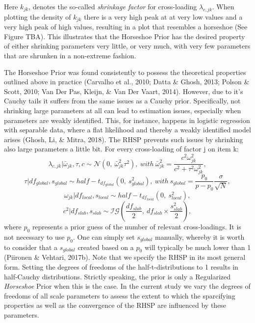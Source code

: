 \documentclass[
  man, donotrepeattitle,floatsintext]{apa6}
\begin{document}
Here \(k_{jk}\), denotes the so-called \emph{shrinkage factor} for cross-loading \(\lambda_{c,jk}\).
When plotting the density of \(k_{jk}\) there is a very high peak at at very low values and a very high peak of high values, resulting in a plot that resembles a horseshoe (See Figure TBA). This illustrates that the Horseshoe Prior has the desired property of either shrinking parameters very little, or very much, with very few parameters that are shrunken in a non-extreme fashion.

The Horseshoe Prior was found consistently to possess the theoretical properties outlined above in practice (Carvalho et al., 2010; Datta \& Ghosh, 2013; Polson \& Scott, 2010; Van Der Pas, Kleijn, \& Van Der Vaart, 2014). However, due to it's Cauchy tails it suffers from the same issues as a Cauchy prior. Specifically, not shrinking large parameters at all can lead to estimation issues, especially when parameters are weakly identified. This, for instance, happens in logistic regression with separable data, where a flat likelihood and thereby a weakly identified model arises (Ghosh, Li, \& Mitra, 2018). The RHSP prevents such issues by shrinking also large parameters a little bit. For every cross-loading of factor j on item k:
\[\lambda_{c,jk} | \bar{\omega}_{jk}, \tau, c\sim \mathcal{N}(0, \ \bar{\omega}^2_{jk} \tau^2), \ with \ \bar{\omega}^2_{jk} = \frac{c^2\omega_{jk}^2}{c^2 + \tau^2 \omega_{jk}^2},\]
\[\tau | df_{global}, s_{global} \sim half-t_{df_{global}}(0,\  s_{global}^2), \ with \  s_{global} = \frac{p_0}{p-p_0}\frac{\sigma}{\sqrt{N}},\]
\[\omega_{jk}| df_{local}, s_{local} \sim half-t_{df_{local}}(0, \ s_{local}^2),\]
\[c^2 | df_{slab}, s_{slab} \sim \mathcal{IG}(\frac{df_{slab}}{2}, \  df_{slab} \times \frac{s_{slab}^2}{2}),\]
where \(p_0\) represents a prior guess of the number of relevant cross-loadings. It is not necessary to use \(p_0\). One can simply set \(s_{global}\) manually, whereby it is worth to consider that a \(s_{global}\) created based on a \(p_0\) will typically be much lower than 1 (Piironen \& Vehtari, 2017b). Note that we specify the RHSP in its most general form. Setting the degrees of freedoms of the half-t-distributions to 1 results in half-Cauchy distributions. Strictly speaking, the prior is only a Regularized \emph{Horseshoe} Prior when this is the case. In the current study we vary the degrees of freedoms of all scale parameters to assess the extent to which the sparcifying properties as well as the convergence of the RHSP are influenced by these parameters.
\end{document}
